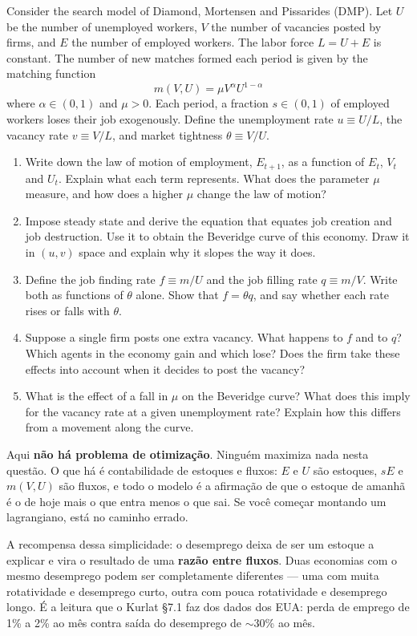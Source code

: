 \documentclass[11pt, a4paper]{article}
\begin{document}
\begin{tcolorbox}[questionbox]
\small
Consider the search model of Diamond, Mortensen and Pissarides (DMP). Let $U$ be the number
of unemployed workers, $V$ the number of vacancies posted by firms, and $E$ the number of
employed workers. The labor force $L = U+E$ is constant. The number of new matches formed
each period is given by the matching function
\[ m(V,U) = \mu V^{\alpha}U^{1-\alpha} \tag{2} \]
where $\alpha\in(0,1)$ and $\mu>0$. Each period, a fraction $s\in(0,1)$ of employed workers
loses their job exogenously. Define the unemployment rate $u\equiv U/L$, the vacancy rate
$v \equiv V/L$, and market tightness $\theta \equiv V/U$.
\begin{enumerate}
\item Write down the law of motion of employment, $E_{t+1}$, as a function of $E_t$, $V_t$
  and $U_t$. Explain what each term represents. What does the parameter $\mu$ measure, and
  how does a higher $\mu$ change the law of motion?
\item Impose steady state and derive the equation that equates job creation and job
  destruction. Use it to obtain the Beveridge curve of this economy. Draw it in $(u,v)$
  space and explain why it slopes the way it does.
\item Define the job finding rate $f\equiv m/U$ and the job filling rate $q\equiv m/V$.
  Write both as functions of $\theta$ alone. Show that $f=\theta q$, and say whether each
  rate rises or falls with $\theta$.
\item Suppose a single firm posts one extra vacancy. What happens to $f$ and to $q$? Which
  agents in the economy gain and which lose? Does the firm take these effects into account
  when it decides to post the vacancy?
\item What is the effect of a fall in $\mu$ on the Beveridge curve? What does this imply
  for the vacancy rate at a given unemployment rate? Explain how this differs from a
  movement along the curve.
\end{enumerate}
\end{tcolorbox}

\begin{tcolorbox}[theorybox, title={A mudança de chave em relação à Questão 1}]
\small
Aqui \textbf{não há problema de otimização}. Ninguém maximiza nada nesta questão. O que há
é contabilidade de estoques e fluxos: $E$ e $U$ são estoques, $sE$ e $m(V,U)$ são fluxos, e
todo o modelo é a afirmação de que o estoque de amanhã é o de hoje mais o que entra menos o
que sai. Se você começar montando um lagrangiano, está no caminho errado.

\smallskip
A recompensa dessa simplicidade: o desemprego deixa de ser um estoque a explicar e vira o
resultado de uma \textbf{razão entre fluxos}. Duas economias com o mesmo desemprego podem
ser completamente diferentes --- uma com muita rotatividade e desemprego curto, outra com
pouca rotatividade e desemprego longo. É a leitura que o Kurlat §7.1 faz dos dados dos EUA:
perda de emprego de 1\% a 2\% ao mês contra saída do desemprego de $\sim$30\% ao mês.
\end{tcolorbox}
\end{document}
